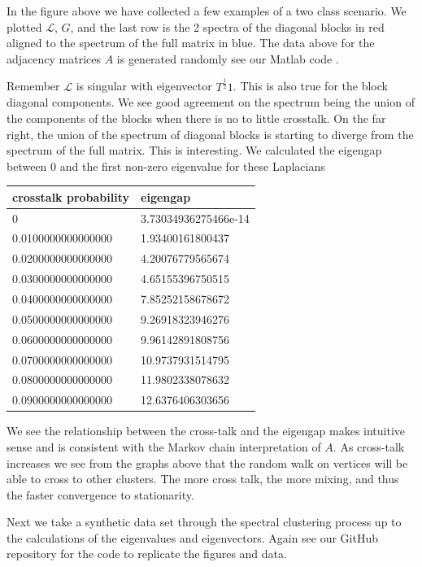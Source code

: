 In the figure above we have collected a few examples of a two class scenario.  We plotted $\mathcal{L}$, $G$, and the last row is the 2 spectra of the diagonal blocks in red aligned to the spectrum of the full matrix in blue.  The data above for the adjacency matrices $A$ is generated randomly see our Matlab code \cite{git_repository}.  

Remember $\mathcal{L}$ is singular with eigenvector $T^{\frac{1}{2}} 1$.  This is also true for the block diagonal components.  We see good agreement on the spectrum being the union of the components of the blocks when there is no to little crosstalk. On the far right, the union of the spectrum of diagonal blocks is starting to diverge from the spectrum of the full matrix.  This is interesting.  We calculated the eigengap between 0 and the first non-zero eigenvalue for these Laplacians

\begin{table}[h!]
\begin{tabular}{ll}
crosstalk probability & eigengap             \\
\hline
0                     & 3.73034936275466e-14 \\
0.0100000000000000    & 1.93400161800437     \\
0.0200000000000000    & 4.20076779565674     \\
0.0300000000000000    & 4.65155396750515     \\
0.0400000000000000    & 7.85252158678672     \\
0.0500000000000000    & 9.26918323946276     \\
0.0600000000000000    & 9.96142891808756     \\
0.0700000000000000    & 10.9737931514795     \\
0.0800000000000000    & 11.9802338078632     \\
0.0900000000000000    & 12.6376406303656    
\end{tabular}
\end{table}

We see the relationship between the cross-talk and the eigengap makes intuitive sense and is consistent with the Markov chain interpretation of $A$.  As cross-talk increases we see from the graphs above that the random walk on vertices will be able to cross to other clusters.  The more cross talk, the more mixing, and thus the faster convergence to stationarity. 

Next we take a synthetic data set through the spectral clustering process up to the calculations of the eigenvalues and eigenvectors. Again see our GitHub repository for the code to replicate the figures and data. 

